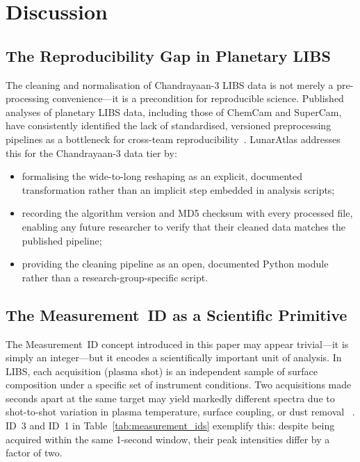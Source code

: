 \documentclass[a4paper,twocolumn,10pt]{article}
\begin{document}
\section{Discussion}
\label{sec:discussion}

\subsection{The Reproducibility Gap in Planetary LIBS}

The cleaning and normalisation of Chandrayaan-3 LIBS data is not
merely a pre-processing convenience---it is a precondition for
reproducible science.  Published analyses of planetary LIBS data,
including those of ChemCam and SuperCam, have consistently identified
the lack of standardised, versioned preprocessing pipelines as a
bottleneck for cross-team reproducibility~\cite{Anderson2022,
Clegg2017}.  LunarAtlas addresses this for the Chandrayaan-3 data
tier by:

\begin{itemize}[nosep,leftmargin=*]
  \item formalising the wide-to-long reshaping as an explicit,
    documented transformation rather than an implicit step embedded in
    analysis scripts;
  \item recording the algorithm version and MD5 checksum with every
    processed file, enabling any future researcher to verify that
    their cleaned data matches the published pipeline;
  \item providing the cleaning pipeline as an open, documented Python
    module rather than a research-group-specific script.
\end{itemize}

\subsection{The Measurement~ID as a Scientific Primitive}

The Measurement~ID concept introduced in this paper may appear
trivial---it is simply an integer---but it encodes a scientifically
important unit of analysis.  In LIBS, each acquisition (plasma shot)
is an independent sample of surface composition under a specific set
of instrument conditions.  Two acquisitions made seconds apart at the
same target may yield markedly different spectra due to shot-to-shot
variation in plasma temperature, surface coupling, or dust removal
~\cite{Wiens2012}.  ID~3 and ID~1 in Table~\ref{tab:measurement_ids}
exemplify this: despite being acquired within the same 1-second window,
their peak intensities differ by a factor of two.
\end{document}

